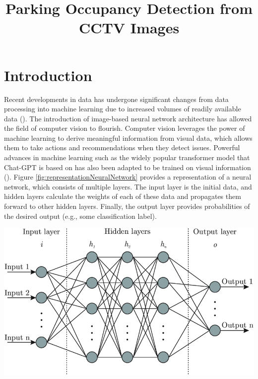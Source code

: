 \documentclass[man]{apa7}
\title{Parking Occupancy Detection from CCTV Images}
\begin{document}
\maketitle
\tableofcontents
\newpage
\section{Introduction}

Recent developments in data has undergone significant changes from data processing into machine learning due to increased volumes of readily available data (\textcite{KHAN20201444}). The introduction of image-based neural network architecture has allowed the field of computer vision to flourish. Computer vision leverages the power of machine learning to derive meaningful information from visual data, which allows them to take actions and recommendations when they detect issues. Powerful advances in machine learning such as the widely popular transformer model that Chat-GPT is based on has also been adapted to be trained on visual information (\textcite{elnouby2021training}). Figure \ref{fig:representationNeuralNetwork} provides a representation of a neural network, which consists of multiple layers. The input layer is the initial data, and hidden layers calculate the weights of each of these data and propagates them forward to other hidden layers. Finally, the output layer provides probabilities of the desired output (e.g., some classification label).

\begin{minipage}{\linewidth}
  \includegraphics[height=\textheight/4 ,width=\textwidth/1]{figures/sampleNeuralNetwork.png}
  \label{fig:representationNeuralNetwork}
\end{minipage}
\end{document}
